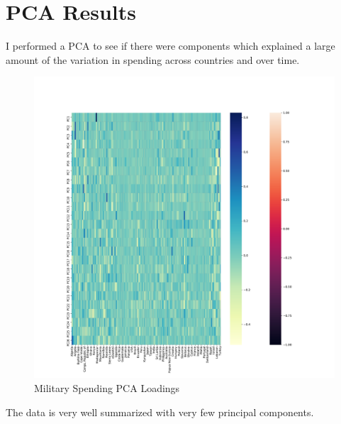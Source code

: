 \documentclass{report}
\begin{document}
    \newpage \clearpage

    \section*{PCA Results}

    I performed a PCA to see if there were components which explained a large amount of the variation in spending across countries and over time.

	\begin{figure}[h!]
		\centering
		\caption{Military Spending PCA Loadings}
		\label{Milex_Loadings}	
		\includegraphics[width=\linewidth,keepaspectratio=true]{../Output/Figures/Milex_Loadings.pdf}
	\end{figure}

    The data is very well summarized with very few principal components.
\end{document}
